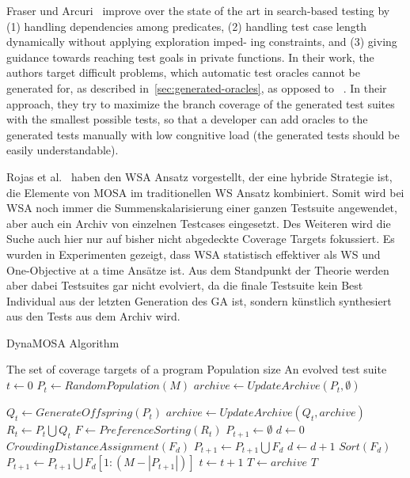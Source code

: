 \documentclass{article}
\newcommand{\Desc}[2]{\State \makebox[2em][l]{#1}#2}
\begin{document}
Fraser und Arcuri~\cite{Fraser_2011} improve over the state of the art in search-based testing by (1) handling dependencies among predicates, (2) handling test case length dynamically without applying exploration imped- ing constraints, and (3) giving guidance towards reaching test goals in private functions. In their work, the authors target difficult problems, which automatic test oracles cannot be generated for, as described in~\cref{sec:generated-oracles}, as opposed to~\cite{Pacheco_2007, Godefroid_2005} . In their approach, they try to maximize the branch coverage of the generated test suites with the smallest possible tests, so that a developer can add oracles to the generated tests manually with low congnitive load (the generated tests should be easily understandable).

Rojas et al.~\cite{Rojas2017} haben den \ac{WSA} Ansatz vorgestellt, der eine hybride Strategie ist, die Elemente von \ac{MOSA} im traditionellen \ac{WS} Ansatz kombiniert. Somit wird bei \ac{WSA} noch immer die Summenskalarisierung einer ganzen Testsuite angewendet, aber auch ein Archiv von einzelnen Testcases eingesetzt. Des Weiteren wird die Suche auch hier nur auf bisher nicht abgedeckte Coverage Targets fokussiert. Es wurden in Experimenten gezeigt, dass \ac{WSA} statistisch effektiver als \ac{WS} und One-Objective at a time Ansätze ist. Aus dem Standpunkt der Theorie werden aber dabei Testsuites gar nicht evolviert, da die finale Testsuite kein Best Individual aus der letzten Generation des \ac{GA} ist, sondern künstlich synthesiert aus den Tests aus dem Archiv wird.

\begin{algorithm}[t]
\caption{DynaMOSA Algorithm~\cite{Panichella2018}}\label{alg:dynamosa}
\begin{algorithmic}
\Input
  \Desc{$U$}{The set of coverage targets of a program}
  \Desc{$M$}{Population size}
  \EndInput
  \Output
  \Desc{$T$}{An evolved test suite}
  \EndOutput
\State $t \gets 0$
\State $P_t \gets RandomPopulation(M)$
\State $archive \gets UpdateArchive(P_t, \emptyset)$

    \State $Q_t \gets GenerateOffspring(P_t)$
    \State $archive \gets UpdateArchive(Q_t, archive)$
    \State $R_t \gets P_t \bigcup Q_t$
    \State $F \gets PreferenceSorting(R_t)$
    \State $P_{t + 1} \gets \emptyset$
    \State $d \gets 0$
        \State $CrowdingDistanceAssignment(F_d)$
        \State $P_{t + 1} \gets P_{t + 1} \bigcup F_d$
        \State $d \gets d + 1$
    \EndWhile
    \State $Sort(F_d)$
    \State $P_{t + 1} \gets P_{t + 1} \bigcup F_d[1 : (M - \left| P_{t + 1} \right|)]$
    \State $t \gets t +  1$
\EndWhile
\State $T \gets archive$
\State \Return $T$
\end{algorithmic}
\end{algorithm}
\end{document}
